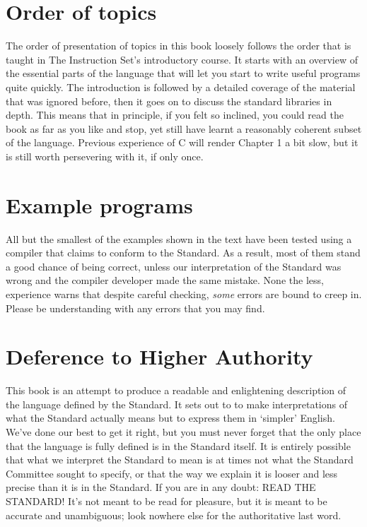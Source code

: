  
        \section*{Order of topics}
        

  

  The order of presentation of topics in this book loosely follows the
   order that is taught in The Instruction Set's introductory course. It
   starts with an overview of the essential parts of the language that will
   let you start to write useful programs quite quickly. The introduction is
   followed by a detailed coverage of the material that was ignored before,
   then it goes on to discuss the standard libraries in depth. This means that
   in principle, if you felt so inclined, you could read the book as far as
   you like and stop, yet still have learnt a reasonably coherent subset of
   the language. Previous experience of C will render Chapter 1 a
   bit slow, but it is still worth persevering with it, if only once.


 
        \section*{Example programs}
        

  

  All but the smallest of the examples shown in the text have been tested
   using a compiler that claims to conform to the Standard. As a result, most
   of them stand a good chance of being correct, unless our interpretation of
   the Standard was wrong and the compiler developer made the same mistake.
   None the less, experience warns that despite careful checking,
   \textit{some} errors are bound to creep in. Please be understanding with
   any errors that you may find.


 
        \section*{Deference to Higher Authority}
        

  

  This book is an attempt to produce a readable and enlightening
   description of the language defined by the Standard. It sets out to to make
   interpretations of what the Standard actually means but to express them in
   `simpler' English. We've done our best to get it right, but you must
   never forget that the only place that the language is fully defined is in
   the Standard itself. It is entirely possible that what we interpret the
   Standard to mean is at times not what the Standard Committee sought to
   specify, or that the way we explain it is looser and less precise than it
   is in the Standard. If you are in any doubt: READ THE STANDARD! It's not
   meant to be read for pleasure, but it is meant to be accurate and
   unambiguous; look nowhere else for the authoritative last word.


